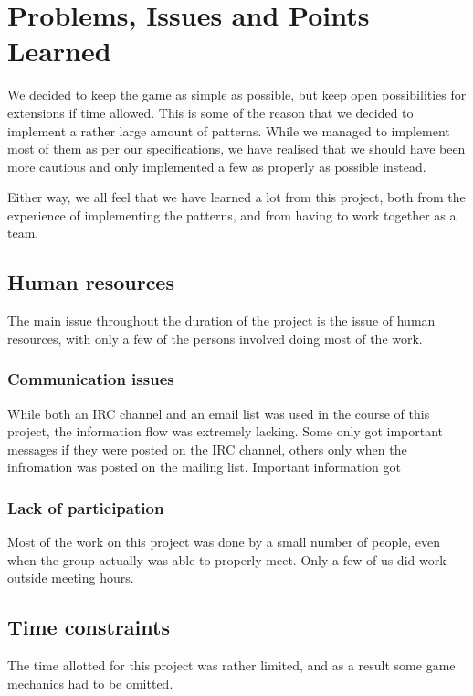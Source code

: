 \chapter{Problems, Issues and Points Learned}
\label{cha:problems_issues_and_points_learned}



We decided to keep the game as simple as possible, but keep open possibilities for extensions if time allowed. This is some of the reason that we decided to implement a rather large amount of patterns. While we managed to implement most of them as per our specifications, we have realised that we should have been more cautious and only implemented a few as properly as possible instead.

Either way, we all feel that we have learned a lot from this project, both from the experience of implementing the patterns, and from having to work together as a team.


\section{Human resources}
The main issue throughout the duration of the project is the issue of human resources, with only a few of the persons involved doing most of the work.



\subsection{Communication issues}
While both an IRC channel and an email list was used in the course of this project, the information flow was extremely lacking. Some only got important messages if they were posted on the IRC channel, others only when the infromation was posted on the mailing list. Important information got 


\subsection{Lack of participation}
Most of the work on this project was done by a small number of people, even when the group actually was able to properly meet. Only a few of us did work outside meeting hours.


\section{Time constraints}
The time allotted for this project was rather limited, and as a result some game mechanics had to be omitted.


